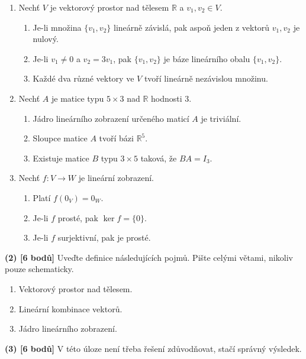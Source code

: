 \documentclass[12pt,a4paper]{article}
\begin{document}
\begin{enumerate}
\item Nechť $V$ je vektorový prostor nad tělesem $\mathbb{R}$ a $v_1,v_2\in V$.
\begin{enumerate}
  \item Je-li množina $\{v_1,v_2\}$ lineárně závislá, pak aspoň jeden z vektorů $v_1,v_2$ je nulový.
  \item Je-li $v_1\neq 0$ a $v_2 = 3v_1$, pak $\{v_1,v_2\}$ je báze lineárního obalu $\{v_1,v_2\}$.
  \item Každé dva různé vektory ve $V$ tvoří lineárně nezávislou množinu.
\end{enumerate}

\item Nechť $A$ je matice typu $5\times 3$ nad $\mathbb{R}$ hodnosti $3$.
\begin{enumerate}
  \item Jádro lineárního zobrazení určeného maticí $A$ je triviální.
  \item Sloupce matice $A$ tvoří bázi $\mathbb{R}^5$.
  \item Existuje matice $B$ typu $3\times 5$ taková, že $BA=I_3$.
\end{enumerate}

\item Nechť $f\colon V\to W$ je lineární zobrazení.
\begin{enumerate}
  \item Platí $f(0_V)=0_W$.
  \item Je-li $f$ prosté, pak $\ker f=\{0\}$.
  \item Je-li $f$ surjektivní, pak je prosté.
\end{enumerate}
\end{enumerate}

\newpage

\textbf{(2) [6 bodů]} Uveďte definice následujících pojmů.
Pište celými větami, nikoliv pouze schematicky.

\begin{enumerate}
  \item Vektorový prostor nad tělesem.
  \item Lineární kombinace vektorů.
  \item Jádro lineárního zobrazení.
\end{enumerate}

\newpage

\textbf{(3) [6 bodů]} V této úloze není třeba řešení zdůvodňovat, stačí správný výsledek.
\end{document}
